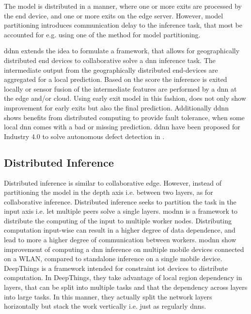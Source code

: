 \begin{enumdescript}
	The model is distributed in a manner, where one or more exits are processed by the end device, and one or more exits on the edge server. However, model partitioning introduces communication delay to the inference task, that most be accounted for e.g. using one of the method for model partitioning.
	
	\gls{ddnn} \cite{teerapittayanon_distributed_2017} extends the idea to formulate a framework, that allows for geographically distributed end devices to collaborative solve a \gls{dnn} inference task. The intermediate output from the geographically distributed end-devices are aggregated for a local prediction. Based on the score the inference is exited locally or sensor fusion of the intermediate features are performed by a \gls{dnn} at the edge and/or cloud. Using early exit model in this fashion, does not only show improvement for early exits but also the final prediction. Additionally \gls{ddnn} shows benefits from distributed computing to provide fault tolerance, when some local \gls{dnn} comes with a bad or missing prediction. \gls{ddnn} have been proposed for Industry 4.0 to solve autonomous defect detection in \cite{li_deep_2018}. 
\end{enumdescript}

\subsection{Distributed Inference}

Distributed inference is similar to collaborative edge. However, instead of partitioning the model in the depth axis i.e. between two layers, as for collaborative inference. Distributed inference seeks to partition the task in the input axis i.e. let multiple peers solve a single layers. \gls{modnn} \cite{mao_modnn:_2017} is a framework to distribute the computing of the input to multiple worker nodes. Distributing computation input-wise can result in a higher degree of data dependence, and lead to more a higher degree of communication between workers. \gls{modnn} show improvement of computing a \gls{dnn} inference on multiple mobile devices connected on a WLAN, compared to standalone inference on a single mobile device. DeepThings \cite{zhao_deepthings:_2018} is a framework intended for constraint \gls{iot} devices to distribute computation. In DeepThings, they take advantage of local region dependency in layers, that can be split into multiple tasks and that the dependency across layers into large tasks. In this manner, they actually split the network layers horizontally but stack the work vertically i.e. just as regularly \gls{dnn}s.









